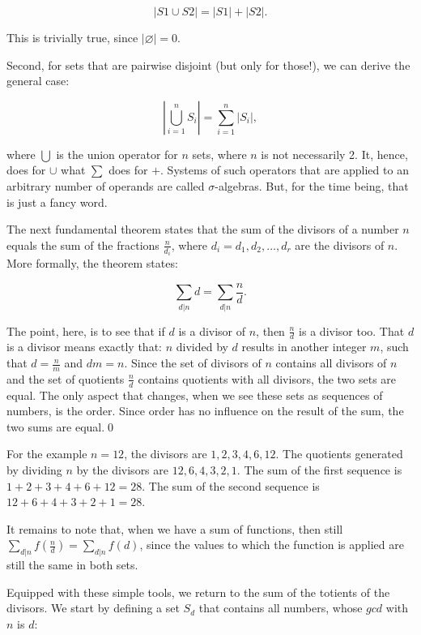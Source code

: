 \documentclass[tikz]{scrreprt}
\newcommand{\Varid}[1]{\mathit{#1}}
\begin{document}
\begin{equation}
|S1 \cup S2| = |S1| + |S2|. 
\end{equation}

This is trivially true, since $|\varnothing| = 0$.

Second, for sets that are pairwise disjoint
(but only for those!), we can derive the
general case:

\begin{equation}\label{eq:CardinalUnion}
\left|\bigcup_{i=1}^n{S_i}\right| = \sum_{i=1}^n{|S_i|}, 
\end{equation}

where $\bigcup$ is the union operator for $n$ sets,
where $n$ is not necessarily 2.
It, hence, does for $\cup$ what $\sum$ does for $+$.
Systems of such operators that are applied to 
an arbitrary number of operands are called
$\sigma$-algebras. But, for the time being,
that is just a fancy word.

The next fundamental theorem states
that the sum of the divisors of a number $n$
equals the sum of the fractions $\frac{n}{d_i}$,
where $d_i = d_1,d_2,\dots,d_r$ are the divisors of $n$.
More formally, the theorem states:

\begin{equation}\label{eq:SumOfDiv}
\sum_{d|n}{d} = \sum_{d|n}{\frac{n}{d}}.
\end{equation}

The point, here, is to see that if $d$ is a divisor of $n$,
then $\frac{n}{d}$ is a divisor too. That $d$ is a divisor
means exactly that: $n$ divided by $d$ results in another
integer $m$, such that $d = \frac{n}{m}$ and $dm=n$.
Since the set of divisors of $n$ contains all divisors
of $n$ and the set of quotients $\frac{n}{d}$ contains
quotients with all divisors, the two sets are equal.
The only aspect that changes, when we see these sets
as sequences of numbers, is the order.
Since order has no influence on the result
of the sum, the two sums are equal.\qed

For the example $n=12$, the divisors are
$1,2,3,4,6,12$. The quotients generated by
dividing $n$ by the divisors are
$12,6,4,3,2,1$.
The sum of the first sequence is $1+2+3+4+6+12 = 28$.
The sum of the second sequence is $12+6+4+3+2+1 = 28$.

It remains to note that, when we have a sum
of functions, then still 
$\sum_{d|n}{f(\frac{n}{d})} = \sum_{d|n}{f(d)}$,
since the values to which the function is applied
are still the same in both sets.

Equipped with these simple tools, we return
to the sum of the totients of the divisors.
We start by defining a set $S_d$ that contains
all numbers, whose \ensuremath{\Varid{gcd}} with $n$ is $d$:
\end{document}
